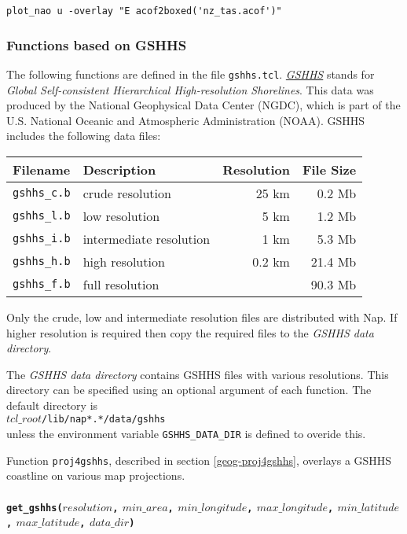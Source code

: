 \begin{verbatim}
plot_nao u -overlay "E acof2boxed('nz_tas.acof')"
\end{verbatim}

\subsubsection{Functions based on GSHHS}
\label{gshhs-functions}

The following functions are defined in the file \texttt{gshhs.tcl}.
\href{http://www.ngdc.noaa.gov/mgg/shorelines/gshhs.html}
{\emph{GSHHS}}
stands for
\emph{Global Self-consistent Hierarchical High-resolution Shorelines}.
This data was produced by the National Geophysical Data Center (NGDC), which is part of
the U.S. National Oceanic and Atmospheric Administration (NOAA).
GSHHS includes the following data files:

\begin{tabular}{|l|l|r|r|}
\hline
Filename & Description & Resolution & File Size \\
\hline
\texttt{gshhs\_c.b} & crude resolution & 25 km & 0.2 Mb \\
\texttt{gshhs\_l.b} & low resolution & 5 km & 1.2 Mb \\
\texttt{gshhs\_i.b} & intermediate resolution & 1 km & 5.3 Mb \\
\texttt{gshhs\_h.b} & high resolution & 0.2 km & 21.4 Mb \\
\texttt{gshhs\_f.b} & full resolution &   & 90.3 Mb \\
\hline
\end{tabular}

Only the crude, low and intermediate resolution files are distributed with Nap.
If higher resolution is required then copy the required files to the
{\em GSHHS data directory}.

The {\em GSHHS data directory} contains GSHHS files with various resolutions.
This directory can be specified using an optional argument of each function.
The default directory is
    \\
    $\mathit{tcl\_root}$\texttt{/lib/nap*.*/data/gshhs}
    \\
     unless the environment variable
    \texttt{GSHHS\_DATA\_DIR}
     is defined to overide this.

Function \texttt{proj4gshhs}, described in section \ref{geog-proj4gshhs},
overlays a GSHHS coastline on various map projections.

\paragraph{\texttt{get\_gshhs(}$\mathit{resolution}$\texttt{,} 
$\mathit{min\_area}$\texttt{,} 
$\mathit{min\_longitude}$\texttt{,} 
$\mathit{max\_longitude}$\texttt{,} 
$\mathit{min\_latitude}$\texttt{,} 
$\mathit{max\_latitude}$\texttt{,} 
$\mathit{data\_dir}$\texttt{)}\\}
    \label{geog-get-gshhs}

